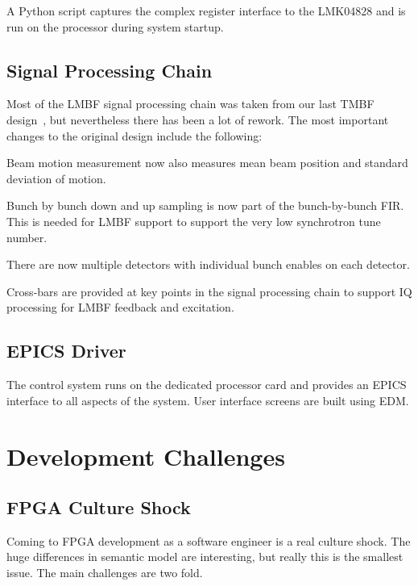\documentclass[
    a4paper,
    keeplastbox,            %
    hyphens,                %
    nospread,               %
]{jacow-2_1}
\begin{document}
A Python script captures the complex register interface to the LMK04828 and is
run on the processor during system startup.


\subsection{Signal Processing Chain}

Most of the LMBF signal processing chain was taken from our last TMBF
design~\cite{icalepcs2015}, but nevertheless there has been a lot of rework.
The most important changes to the original design include the following:

\begin{Itemize}
\item
    Beam motion measurement now also measures mean beam position and standard
    deviation of motion.
\item
    Bunch by bunch down and up sampling is now part of the bunch-by-bunch FIR.
    This is needed for LMBF support to support the very low synchrotron tune
    number.
\item
    There are now multiple detectors with individual bunch enables on each
    detector.
\item
    Cross-bars are provided at key points in the signal processing chain to
    support IQ processing for LMBF feedback and excitation.
\end{Itemize}


\subsection{EPICS Driver}

The control system runs on the dedicated processor card and provides an EPICS
interface to all aspects of the system.  User interface screens are built using
EDM.


\section{Development Challenges}

\subsection{FPGA Culture Shock}

Coming to FPGA development as a software engineer is a real culture shock.  The
huge differences in semantic model are interesting, but really this is the
smallest issue.  The main challenges are two fold.
\end{document}
